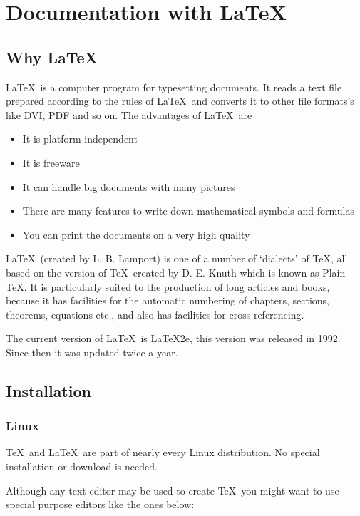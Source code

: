 
\chapter{Documentation with \LaTeX}


\section{Why \LaTeX}

\LaTeX\ is a computer program for typesetting documents.  It
reads a text file prepared according to the rules of
\LaTeX\, and converts it to other file formats's like DVI, PDF and so on.
The advantages of \LaTeX\ are
\begin{itemize}
\item It is platform independent
\item It is freeware
\item It can handle big documents with many pictures
\item There are many features to write down mathematical symbols and formulas
\item You can print the documents on a very high quality
\end{itemize}

\LaTeX\ (created by L. B. Lamport) is one of a number of `dialects' of \TeX, all based %
on the version of \TeX\ created by D. E. Knuth which is known as Plain \TeX.
It is particularly suited to the production of long articles and books, because it has
facilities for the automatic numbering of chapters, sections, theorems, equations etc., 
and also has facilities for cross-referencing.

The current version of \LaTeX\ is \LaTeX2e, this version was released in
1992. Since then it was updated twice a year.


\section{Installation}

\subsection{Linux}

\TeX\ and \LaTeX\ are part of nearly every Linux distribution.
No special installation or download is needed.

Although any text editor may be used to create \TeX\ 
you might want to use special purpose editors like the ones below:

